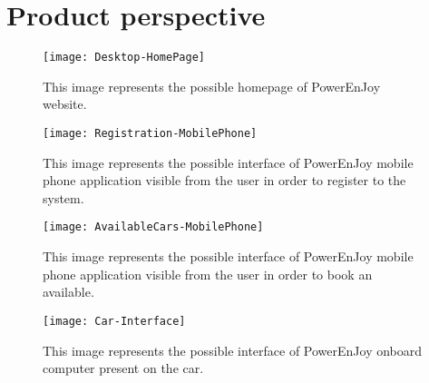 \section{Product perspective}

\begin{figure}[H]
	\centering
	\texttt{[image: Desktop-HomePage]}
	\caption[Car state diagram]{This image represents the possible homepage of PowerEnJoy website.}
	\label{fig:Desktop-HomePage}
\end{figure}

\begin{figure}[H]
	\centering
	\texttt{[image: Registration-MobilePhone]}
	\caption[Car state diagram]{This image represents the possible interface of PowerEnJoy mobile phone application visible from the user in order to register to the system.}
	\label{fig:Registration-MobilePhone}
\end{figure}

\begin{figure}[H]
	\centering
	\texttt{[image: AvailableCars-MobilePhone]}
	\caption[Car state diagram]{This image represents the possible interface of PowerEnJoy mobile phone application visible from the user in order to book an available.}
	\label{fig:AvailableCars-MobilePhone}
\end{figure}

\begin{figure}[H]
	\centering
	\texttt{[image: Car-Interface]}
	\caption[Car state diagram]{This image represents the possible interface of PowerEnJoy onboard computer present on the car.}
	\label{fig:Car-Interface}
\end{figure}